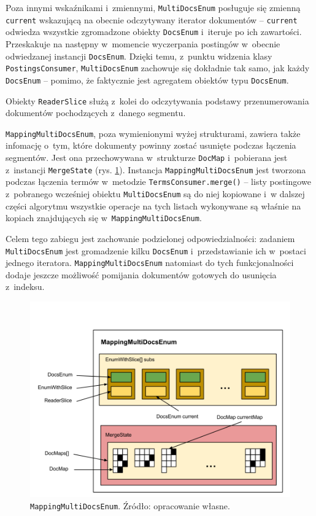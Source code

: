 Poza innymi wskaźnikami i~zmiennymi, \texttt{MultiDocsEnum} posługuje się zmienną \texttt{current} wskazującą na obecnie odczytywany iterator dokumentów -- \texttt{current} odwiedza wszystkie zgromadzone obiekty \texttt{DocsEnum} i~iteruje po ich zawartości. Przeskakuje na następny w~momencie wyczerpania postingów w~obecnie odwiedzanej instancji \texttt{DocsEnum}. Dzięki temu, z~punktu widzenia klasy \texttt{PostingsConsumer}, \texttt{MultiDocsEnum} zachowuje się dokładnie tak samo, jak każdy \texttt{DocsEnum} -- pomimo, że faktycznie jest agregatem obiektów typu \texttt{DocsEnum}. 

Obiekty \texttt{ReaderSlice} służą z~kolei do odczytywania podstawy przenumerowania dokumentów pochodzących z~danego segmentu.

\texttt{MappingMultiDocsEnum}, poza wymienionymi wyżej strukturami, zawiera także infomację o~tym, które dokumenty powinny zostać usunięte podczas łączenia segmentów. Jest ona przechowywana w~strukturze \texttt{DocMap} i~pobierana jest z~instancji \texttt{MergeState} (rys. \ref{fig:mappingMultiDocsEnum}). Instancja \texttt{MappingMultiDocsEnum} jest tworzona podczas łączenia termów w~metodzie \texttt{TermsConsumer.merge()} -- listy postingowe z~pobranego wcześniej obiektu \texttt{MultiDocsEnum} są do niej kopiowane i~w dalszej części algorytmu wszystkie operacje na tych listach wykonywane są właśnie na kopiach znajdujących się w~\texttt{MappingMultiDocsEnum}. 

Celem tego zabiegu jest zachowanie podzielonej odpowiedzialności: zadaniem \texttt{MultiDocsEnum} jest gromadzenie kilku \texttt{DocsEnum} i~przedstawianie ich w~postaci jednego iteratora. \texttt{MappingMultiDocsEnum} natomiast do tych funkcjonalności dodaje jeszcze możliwość pomijania dokumentów gotowych do usunięcia z~indeksu. 

\begin{figure}[here]
 \includegraphics[scale=0.4]{pictures/MappingMultiDocsEnum.png}
 \caption{\texttt{MappingMultiDocsEnum}. Źródło: opracowanie własne. \label{fig:mappingMultiDocsEnum}}
\end{figure}


